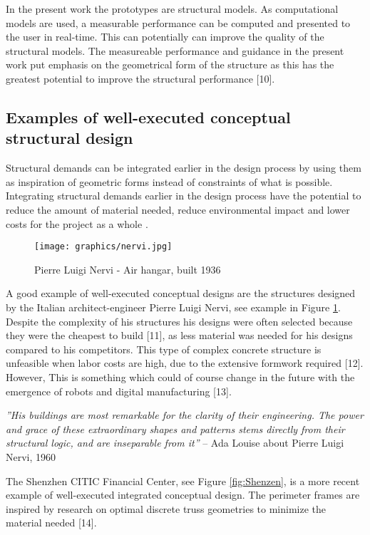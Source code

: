 In the present work the prototypes are structural models. As computational models are used, a measurable performance can be computed and presented to the user in real-time. This can potentially can improve the quality of the structural models. The measureable performance and guidance in the present work put emphasis on the geometrical form of the structure as this has the greatest potential to improve the structural performance [10]. 

\subsection{Examples of well-executed conceptual structural design}
Structural demands can be integrated earlier in the design process by using them as inspiration of geometric forms instead of constraints of what is possible. Integrating structural demands earlier in the design process have the potential to reduce the amount of material needed, reduce environmental impact and lower costs for the project as a whole \cite{Mueller2014}. 

\begin{figure}
  \texttt{[image: graphics/nervi.jpg]}
  \caption{Pierre Luigi Nervi - Air hangar, built 1936}
  \label{fig:nervi}
\end{figure}

A good example of well-executed conceptual designs are the structures designed by the Italian architect-engineer Pierre Luigi Nervi, see example in Figure \ref{fig:nervi}. Despite the complexity of his structures his designs were often selected because they were the cheapest to build [11], as less material was needed for his designs compared to his competitors. This type of complex concrete structure is unfeasible when labor costs are high, due to the extensive formwork required [12]. However, This is something which could of course change in the future with the emergence of robots and digital manufacturing [13].

\textit{''His buildings are most remarkable for the clarity of their engineering. The power and grace of these extraordinary shapes and patterns stems directly from their structural logic, and are inseparable from it''} – Ada Louise about Pierre Luigi Nervi, 1960 \cite{Mueller2014}

The Shenzhen CITIC Financial Center, see Figure \ref{fig:Shenzen}, is a more recent example of well-executed integrated conceptual design. The perimeter frames are inspired by research on optimal discrete truss geometries to minimize the material needed [14].

